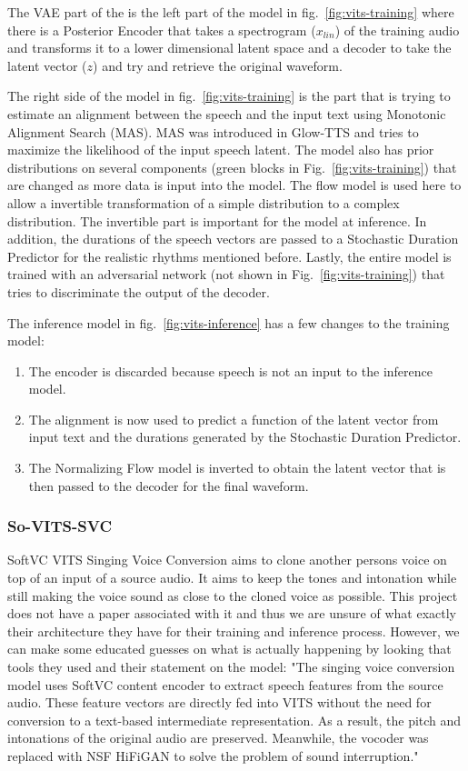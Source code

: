 \documentclass[conference]{IEEEtran}
\begin{document}
The VAE part of the is the left part of the model in fig.~\ref{fig:vits-training} where there is a Posterior Encoder that takes
a spectrogram ($x_{lin}$) of the training audio and transforms it to a lower dimensional latent space and 
a decoder to take the latent vector ($z$) and try and retrieve the original waveform.

The right side of the model in fig.~\ref{fig:vits-training} is the part that is trying to estimate an alignment between 
the speech and the input text using Monotonic Alignment Search (MAS). MAS was introduced in Glow-TTS \cite{glowtts}
and tries to maximize the likelihood of the input speech latent.
The model also has prior distributions on several components (green blocks in Fig.~\ref{fig:vits-training})
that are changed as more data is input into the model. The flow model is used here to allow a
invertible transformation of a simple distribution to a complex distribution. The invertible part is important
for the model at inference.
In addition, the durations of the speech vectors 
are passed to a Stochastic Duration Predictor for the realistic rhythms mentioned before.
Lastly, the entire model is trained with an adversarial network (not shown in Fig.~\ref{fig:vits-training})
that tries to discriminate the output of the decoder.

The inference model in fig.~\ref{fig:vits-inference} has a few changes to the training model:
\begin{enumerate}
    \item The encoder is discarded because speech is not an input to the inference model.
    \item The alignment is now used to predict a function of the latent vector from input text and the durations
    generated by the Stochastic Duration Predictor.
    \item The Normalizing Flow model is inverted to obtain the latent vector that is then passed to the decoder
    for the final waveform.
\end{enumerate}

\subsubsection{So-VITS-SVC}
SoftVC VITS Singing Voice Conversion aims to clone another persons voice on top of an input of a source audio.
It aims to keep the tones and intonation while still making the voice sound as close to the cloned voice as possible.
This project does not have a paper associated with it and thus we are unsure of what exactly their
architecture they have for their training and inference process. However, we can make some educated
guesses on what is actually happening by looking that tools they used and their statement on the model:
"The singing voice conversion model uses SoftVC content encoder to extract speech features from the source audio. These feature vectors are directly fed into VITS without the need for conversion to a text-based intermediate representation. As a result, the pitch and intonations of the original audio are preserved. Meanwhile, the vocoder was replaced with NSF HiFiGAN to solve the problem of sound interruption." \cite{sovitssvc-repo}
\end{document}
